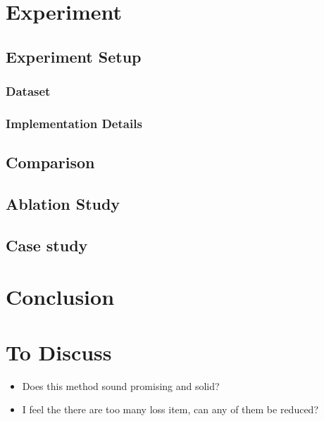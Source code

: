 \documentclass[10pt,twocolumn,letterpaper]{article}
\begin{document}
\section{Experiment}

\subsection{Experiment Setup}

\subsubsection{Dataset}

\subsubsection{Implementation Details}

\subsection{Comparison}

\subsection{Ablation Study}

\subsection{Case study}

\section{Conclusion}

\section{To Discuss}
\begin{itemize}
	\item Does this method sound promising and solid?
	\item I feel the there are too many loss item, can any of them be reduced?
\end{itemize}


{\small


}
\end{document}
